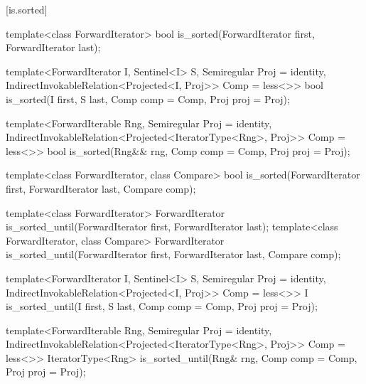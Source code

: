 [is.sorted]{}

%
\begin{removedblock}
\begin{itemdecl}
template<class ForwardIterator>
  bool is_sorted(ForwardIterator first, ForwardIterator last);
\end{itemdecl}
\end{removedblock}
\begin{addedblock}
\begin{itemdecl}
template<ForwardIterator I, Sentinel<I> S, Semiregular Proj = identity,
    IndirectInvokableRelation<Projected<I, Proj>> Comp = less<>>
  bool is_sorted(I first, S last, Comp comp = Comp{}, Proj proj = Proj{});

template<ForwardIterable Rng, Semiregular Proj = identity,
    IndirectInvokableRelation<Projected<IteratorType<Rng>, Proj>> Comp = less<>>
  bool
    is_sorted(Rng&& rng, Comp comp = Comp{}, Proj proj = Proj{});
\end{itemdecl}
\end{addedblock}

\begin{itemdescr}
\pnum
\returns {}
\end{itemdescr}

\begin{removedblock}
%
\begin{itemdecl}
template<class ForwardIterator, class Compare>
  bool is_sorted(ForwardIterator first, ForwardIterator last,
    Compare comp);
\end{itemdecl}

\begin{itemdescr}
\pnum
\returns {}
\end{itemdescr}
\end{removedblock}

%
\begin{removedblock}
\begin{itemdecl}
template<class ForwardIterator>
  ForwardIterator is_sorted_until(ForwardIterator first, ForwardIterator last);
template<class ForwardIterator, class Compare>
  ForwardIterator is_sorted_until(ForwardIterator first, ForwardIterator last,
    Compare comp);
\end{itemdecl}
\end{removedblock}
\begin{addedblock}
\begin{itemdecl}
template<ForwardIterator I, Sentinel<I> S, Semiregular Proj = identity,
    IndirectInvokableRelation<Projected<I, Proj>> Comp = less<>>
  I is_sorted_until(I first, S last, Comp comp = Comp{}, Proj proj = Proj{});

template<ForwardIterable Rng, Semiregular Proj = identity,
    IndirectInvokableRelation<Projected<IteratorType<Rng>, Proj>> Comp = less<>>
  IteratorType<Rng>
    is_sorted_until(Rng& rng, Comp comp = Comp{}, Proj proj = Proj{});
\end{itemdecl}
\end{addedblock}

